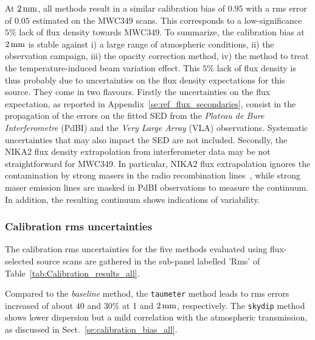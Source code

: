 At $2\,\rm{mm}$, all methods result in a similar calibration bias
of $0.95$ with a rms error of $0.05$ estimated on the MWC349 scans. 
This corresponds to a low-significance $5\%$ lack of flux density
towards MWC349.
To summarize, the calibration bias at $2\, \rm{mm}$ is stable against
i) a large range of atmospheric conditions, ii) the observation campaign, iii) the
opacity correction method, iv) the method to treat the
temperature-induced beam variation effect.
This $5\%$ lack of flux density is thus probably due to
uncertainties on the flux density expectations for this source.
They come in two flavours.
{\lp Firstly the uncertainties on the flux expectation, as reported in
Appendix~\ref{se:ref_flux_secondaries}, consist in the propagation of
the errors on the fitted SED from the \emph{Plateau de Bure Interferometre}
(PdBI) and the \emph{Very Large Array} (VLA) observations. Systematic
uncertainties that may also impact the SED are not included.}  
Secondly, the NIKA2 flux density extrapolation from
interferometer data may be not straightforward for MWC349. {\lp In
particular, NIKA2 flux extrapolation ignores the contamination by
strong masers in the radio recombination lines~\citep{masingRRL},
while strong maser emission lines are masked in PdBI observations to
measure the continuum. In addition, the resulting continuum shows
indications of variability.}


\subsubsection{Calibration rms uncertainties}

The calibration rms uncertainties for the five methods evaluated using
flux-selected source scans are gathered in the sub-panel labelled 'Rms'
of Table~\ref{tab:Calibration_results_all}.

Compared to the \emph{baseline} method, the {\tt taumeter} method leads to 
rms errors increased of about $40$ and $30\%$ at 1 and
$2\,\rm{mm}$, respectively. The {\tt skydip} method shows lower
dispersion but a mild correlation with the atmospheric transmission, as
discussed in Sect.~\ref{se:calibration_bias_all}.

